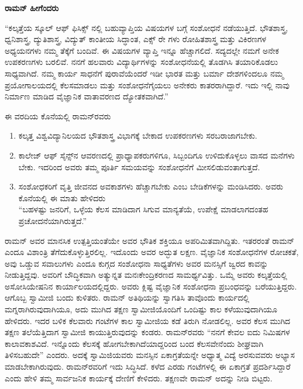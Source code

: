 \vskip 2pt

\textbf{ರಾಮನ್ ಹೀಗೆಂದರು}

\vskip 2pt

“ಕಲ್ಕತ್ತೆಯ ಸ್ಕೂಲ್ ಆಫ್ ಫಿಸಿಕ್ಸ್ ನಲ್ಲಿ ಬಹುವ್ಯಾಪ್ತಿಯ ವಿಷಯಗಳ ಬಗ್ಗೆ ಸಂಶೋಧನೆ ನಡೆಯುತ್ತಿದೆ. ಭೌತಶಾಸ್ತ್ರ, ಧ್ವನಿಶಾಸ್ತ್ರ, ದ್ಯುತಿಶಾಸ್ತ್ರ, ವಿದ್ಯುತ್ ಕಾಂತೀಯ ಸಿದ್ಧಾಂತ, ಎಕ್ಸ್ ರೇ ಗಳು ರೋಹಿತಶಾಸ್ತ್ರ ಮತ್ತು ವಿಕಿರಣಗಳ ಅಧ್ಯಯನಗಳು ನಮ್ಮ ತೆಕ್ಕೆಗೆ ಬಂದಿವೆ. ಈ ವಿಷಯಗಳ ವ್ಯಾಪ್ತಿ ಇನ್ನೂ ಹೆಚ್ಚಾಗಲಿದೆ. ಸದ್ಯದಲ್ಲೇ ನಮಗೆ ಅನೇಕ ಉಪಕರಣಗಳು ಬರಲಿವೆ. ನನಗೆ ಹಲವಾರು ವಿದ್ಯಾರ್ಥಿಗಳನ್ನು ಸಂಶೋಧನೆಯಲ್ಲಿ ತೊಡಗಿಸಿ ತಯಾರಿಕೊಡಲು ಸಾಧ್ಯವಾಗಿದೆ. ನಮ್ಮ ಕಾರ್ಯ ಸಾಧನೆಗೆ ಪುರಾವೆಯೆಂದರೆ ಇಡೀ ಭಾರತ ಮತ್ತು ಬರ್ಮಾ ದೇಶಗಳಿಂದಲೂ ನಮ್ಮ ಪ್ರಯೋಗಾಲಯದಲ್ಲಿ ಕೆಲಸಮಾಡಲು ಮತ್ತು ಸಂಶೋಧನೆಗೈಯಲು ಅನೇಕರು ಕಾತರರಾಗಿದ್ದಾರೆ. ಇದು ಇಲ್ಲಿ ನಾವು ನಿರ್ಮಾಣ ಮಾಡಿದ ವೈಜ್ಞಾನಿಕ ವಾತಾವರಣದ ದ್ಯೋತಕವಾಗಿದೆ.”

\vskip 3pt

ಈ ವರದಿಯ ಕೊನೆಯಲ್ಲಿ ರಾಮನ್‍ರವರು

\begin{enumerate}
\item ಕಲ್ಕತ್ತ ವಿಶ್ವವಿದ್ಯಾನಿಲಯದ ಭೌತಶಾಸ್ತ್ರ ವಿಭಾಗಕ್ಕೆ ಬೇಕಾದ ಉಪಕರಣಗಳು ಸರಬರಾಜಾಗ\-ಬೇಕು. 

 \item ಕಾಲೇಜ್ ಆಫ್ ಸೈನ್ಸ್‌ನ ಆವರಣದಲ್ಲಿ ಪ್ರಾಧ್ಯಾಪಕರುಗಳಿಗೂ, ಸಿಬ್ಬಂದಿಗೂ ಉಳಿದುಕೊಳ್ಳಲು ವಾಸದ ಮನೆಗಳು ಬೇಕು. ಇದರಿಂದ ಅವರು ತಮ್ಮ ಪೂರ್ತಿ ಸಮಯವನ್ನು ಸಂಶೋಧನೆಗೆ ಮೀಸಲಿಡುವಂತಾಗುತ್ತದೆ.

 \item ಸಂಶೋಧಕರಿಗೆ ವೃತ್ತಿ ಜೀವನದ ಅವಕಾಶಗಳು ಹೆಚ್ಚಾಗಬೇಕು ಎಂಬ ಬೇಡಿಕೆಗಳನ್ನು ಮಂಡಿಸಿ\-ದರು. ಅವರು ಕೊನೆಯಲ್ಲಿ ಈ ಮಾತು ಹೇಳಿದರು \\“ಬಹಳಷ್ಟು ಜನರಿಗೆ, ಒಳ್ಳೆಯ ಕೆಲಸ ಮಾಡಿದಾಗ ಸಿಗುವ ಮಾನ್ಯತೆಯೆ, ಉಪೇಕ್ಷೆ ಮಾಡಲಾಗದಂತಹ ಪ್ರಚೋದನೆಯಾಗಿರುತ್ತದೆ.”

\end{enumerate}

\vskip 3pt

ರಾಮನ್ ಅವರ ಮಾನಸಿಕ ಉತ್ಪತ್ತಿಯಂತೆಯೇ ಅವರ ಭೌತಿಕ ಶಕ್ತಿಯೂ ಅಪರಿಮಿತವಾಗಿದ್ದಿತು. ಇತರರಂತೆ ರಾಮನ್ ಎಂದೂ ವಿಶಾಂತ್ರಿ ತೆಗೆದುಕೊಳ್ಳುತ್ತಿರಲಿಲ್ಲ. ಇದೊಂದು ಅವರ ಅದ್ಭುತ ಲಕ್ಷಣ. ವೈಜ್ಞಾನಿಕ ಸಂಶೋಧನೆಗಳ ರೋಚಕತೆ, ಅವು ಒಡ್ಡುವ ಸವಾಲುಗಳು ಎಂದೂ ಕುಗ್ಗದ ಸಂಶೋಧನಾ ಸಾಧ್ಯತೆಗಳು ಅವರ ಮನಸ್ಸಿಗೆ ಜ್ವರದ ಕಾವನ್ನು ನೀಡುತ್ತಿದ್ದವು. ಅವರಿಗೆ ಬೌದ್ಧಿಕವಾಗಿ ಅತ್ಯುನ್ನತ ಮನಃಕೇಂದ್ರಿಕರಣದ ಸಾಮರ್ಥ್ಯವಿತ್ತು. ಒಮ್ಮೆ ಅವರು ಕಲ್ಕತ್ತೆಯಲ್ಲಿ ಅಸೋಸಿಯೇಷನಿನ ಕಾರ್ಯಾಲಯದಲ್ಲಿದ್ದರು. ಅವರು ಕ್ಲಿಷ್ಟ ವೈಜ್ಞಾನಿಕ ಸಂಶೋಧನಾ ಪ್ರಬಂಧವನ್ನು ಬರೆಯುತ್ತಿದ್ದರು. ಆಗೊಬ್ಬ ಸ್ವಾಮೀಜಿ ಬಂದು ಕುಳಿತರು. ರಾಮನ್ ಅತಿಥಿಯನ್ನು ಸ್ವಾಗತಿಸಿ ತಾವೊಂದು ಕಾರ್ಯದಲ್ಲಿ ಮಗ್ನರಾಗಿರುವುದಾಗಿಯೂ, ಅದು ಮುಗಿದ ತಕ್ಷಣ ಸ್ವಾಮೀಜಿಯೊಂದಿಗೆ ಒಂದಿಷ್ಟು ಕಾಲ ಕಳೆಯುವು\-ದಾಗಿಯೂ ಹೇಳಿದರು. ಇದರ ಬಳಿಕ ಕೆಲವಾರು ಗಂಟೆಗಳ ಕಾಲ ಸ್ವಾಮೀಜಿಯ ಕಡೆ ತಿರುಗಿ ನೋಡಲಿಲ್ಲ. ಅವರ ಕೆಲಸ ಮುಗಿದ ತಕ್ಷಣ ತಲೆಯೆತ್ತಿದಾಗ ಸ್ವಾಮೀಜಿ ಕಾಯುತ್ತಿರುವುದನ್ನು ಕಂಡರು. ರಾಮನ್‍ರವರು “ನನಗೆ ಕೇವಲ ಐದು ನಿಮಿಷಗಳ ಕಾಲಾವಕಾಶವಿದೆ. ಇನ್ನೊಂದು ಕೆಲಸಕ್ಕೆ ಹೋಗಬೇಕಾಗಿದೆಯಾದ್ದರಿಂದ ಬಂದ ಕೆಲಸವೇನೆಂದು ಶೀಘ್ರವಾಗಿ ತಿಳಿಸಬಹುದೇ” ಎಂದರು. ಅದಕ್ಕೆ ಸ್ವಾಮಿಜಿಯವರು ಮನಸ್ಸಿನ ಏಕಾಗ್ರತೆಯನ್ನೇ ಅಧ್ಯಾತ್ಮ ವಿದ್ಯೆ ಅರಸುವವರು ಅಭ್ಯಾಸ ಮಾಡಬೇಕಾಗಿರುವುದು. ರಾಮನ್‍ರವರಿಗೆ ಇದು ಸಿದ್ಧಿಸಿದೆ. ಕಳೆದ ಎರಡು ಗಂಟೆಗಳಲ್ಲಿ ಈ ಏಕಾಗ್ರತೆ ಪ್ರದರ್ಶಿಸಿದ್ದಾರೆ ಎಂದು ಹೇಳಿ ತಮ್ಮ ಸಾರ್ವಜನಿಕ ಕಾರ್ಯಕ್ಕೆ ದೇಣಿಗೆ ಕೇಳಿದರು. ತಕ್ಷಣವೇ ರಾಮನ್ ಅದನ್ನು ನೀಡಿ ಬಿಟ್ಟರು.

